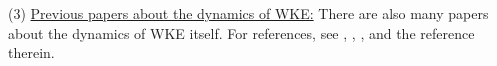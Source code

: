 

(3) \underline{Previous papers about the dynamics of WKE:} There are also many papers about the dynamics of WKE itself. For references, see \cite{germain2020optimal}, \cite{gamba2020wave}, \cite{soffer2018dynamics}, \cite{soffer2020energy} and the reference therein.




